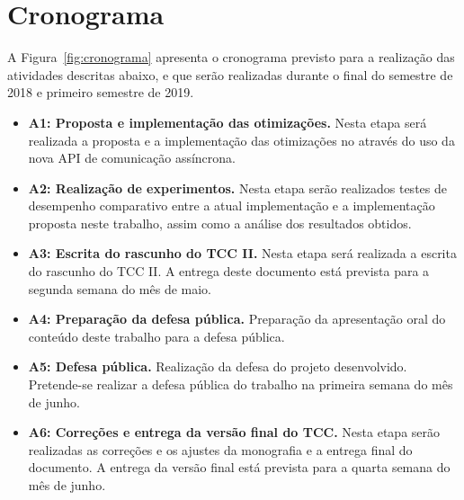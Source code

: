 %

\chapter{Cronograma}
\label{cap:cronograma}

A Figura~\ref{fig:cronograma} apresenta o cronograma previsto para a realização das atividades descritas abaixo, e que serão realizadas durante o final do semestre de 2018 e primeiro semestre de 2019.

\begin{itemize}
	\item \textbf{A1: Proposta e implementação das otimizações.} Nesta etapa será realizada a proposta e a implementação das otimizações no \pskel{} através do uso da nova API de comunicação assíncrona.
	
	\item \textbf{A2: Realização de experimentos.} Nesta etapa serão realizados testes de desempenho comparativo entre a atual implementação e a implementação proposta neste trabalho, assim como a análise dos resultados obtidos.
	
	\item \textbf{A3: Escrita do rascunho do TCC II.} Nesta etapa será realizada a escrita do rascunho do TCC II. A entrega deste documento está prevista para a segunda semana do mês de maio.
	
	\item \textbf{A4: Preparação da defesa pública.} Preparação da apresentação oral do conteúdo deste trabalho para a defesa pública.
	
	\item \textbf{A5: Defesa pública.} Realização da defesa do projeto desenvolvido. Pretende-se realizar a defesa pública do trabalho na primeira semana do mês de junho.
	
	\item \textbf{A6: Correções e entrega da versão final do TCC.} Nesta etapa serão realizadas as correções e os ajustes da monografia e a entrega final do documento. A entrega da versão final está prevista para a quarta semana do mês de junho.
\end{itemize}




